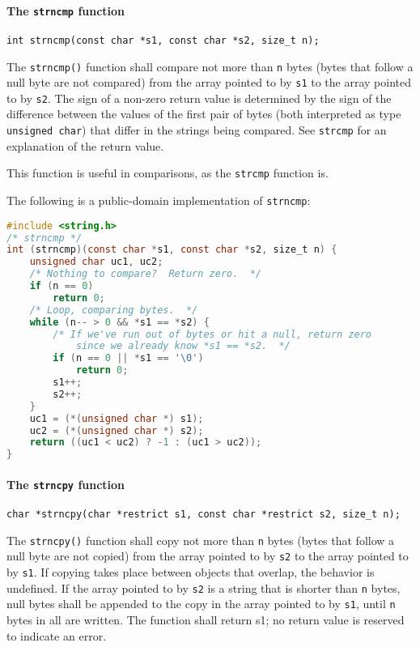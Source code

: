 \paragraph{The \texttt{strncmp} function}
\texttt{int strncmp(const char *s1, const char *s2, size\_t n);}

The \texttt{strncmp()} function shall compare not more than \texttt{n} bytes
(bytes that follow a null byte are not compared) from the array pointed to by
\texttt{s1} to the array pointed to by \texttt{s2}. The sign of a non-zero
return value is determined by the sign of the difference between the values of
the first pair of bytes (both interpreted as type \texttt{unsigned char}) that
differ in the strings being compared. See \texttt{strcmp} for an explanation of
the return value.

This function is useful in comparisons, as the \texttt{strcmp} function is.

The following is a public-domain implementation of \texttt{strncmp}:

\lstset{basicstyle=\scriptsize, numbers=left, captionpos=b, tabsize=4}
\begin{lstlisting}[caption=Section \thesection listing \arabic{stringcnt},language={C},
breaklines=true,xleftmargin=15pt,label=lst:section\thesection listing\arabic{stringcnt}]
#include <string.h>
/* strncmp */
int (strncmp)(const char *s1, const char *s2, size_t n) {
	unsigned char uc1, uc2;
	/* Nothing to compare?  Return zero.  */
	if (n == 0)
		return 0;
	/* Loop, comparing bytes.  */
	while (n-- > 0 && *s1 == *s2) {
	    /* If we've run out of bytes or hit a null, return zero
	        since we already know *s1 == *s2.  */
	    if (n == 0 || *s1 == '\0')
	      	return 0;
	    s1++;
	    s2++;
	}
	uc1 = (*(unsigned char *) s1);
	uc2 = (*(unsigned char *) s2);
	return ((uc1 < uc2) ? -1 : (uc1 > uc2));
}
\end{lstlisting}

\paragraph{The \texttt{strncpy} function}
\texttt{char *strncpy(char *restrict s1, const char *restrict s2, size\_t n);}

The \texttt{strncpy()} function shall copy not more than \texttt{n} bytes
(bytes that follow a null byte are not copied) from the array pointed to by
\texttt{s2} to the array pointed to by \texttt{s1}. If copying takes place
between objects that overlap, the behavior is undefined. If the array pointed
to by \texttt{s2} is a string that is shorter than \texttt{n} bytes, null bytes
shall be appended to the copy in the array pointed to by \texttt{s1}, until
\texttt{n} bytes in all are written. The function shall return s1; no return
value is reserved to indicate an error.


